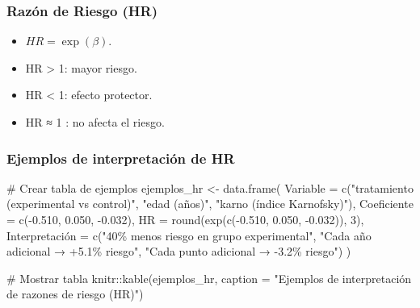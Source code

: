 \documentclass[
]{article}
\newenvironment{Shaded}{\begin{snugshade}}{\end{snugshade}}
\newcommand{\AttributeTok}[1]{\textcolor[rgb]{0.40,0.45,0.13}{#1}}
\newcommand{\CommentTok}[1]{\textcolor[rgb]{0.37,0.37,0.37}{#1}}
\newcommand{\DecValTok}[1]{\textcolor[rgb]{0.68,0.00,0.00}{#1}}
\newcommand{\FloatTok}[1]{\textcolor[rgb]{0.68,0.00,0.00}{#1}}
\newcommand{\FunctionTok}[1]{\textcolor[rgb]{0.28,0.35,0.67}{#1}}
\newcommand{\NormalTok}[1]{\textcolor[rgb]{0.00,0.23,0.31}{#1}}
\newcommand{\OtherTok}[1]{\textcolor[rgb]{0.00,0.23,0.31}{#1}}
\newcommand{\SpecialCharTok}[1]{\textcolor[rgb]{0.37,0.37,0.37}{#1}}
\newcommand{\StringTok}[1]{\textcolor[rgb]{0.13,0.47,0.30}{#1}}
\providecommand{\tightlist}{%
  \setlength{\itemsep}{0pt}\setlength{\parskip}{0pt}}\usepackage{longtable,booktabs,array}
\begin{document}
\subsubsection{Razón de Riesgo (HR)}\label{razuxf3n-de-riesgo-hr}

\begin{itemize}
\tightlist
\item
  \(HR = \exp(\beta)\).
\item
  HR \textgreater{} 1: mayor riesgo.
\item
  HR \textless{} 1: efecto protector.
\item
  HR ≈ 1 : no afecta el riesgo.
\end{itemize}

\subsubsection{Ejemplos de interpretación de
HR}\label{ejemplos-de-interpretaciuxf3n-de-hr}

\begin{Shaded}
\begin{Highlighting}[]
\CommentTok{\# Crear tabla de ejemplos}
\NormalTok{ejemplos\_hr }\OtherTok{\textless{}{-}} \FunctionTok{data.frame}\NormalTok{(}
  \AttributeTok{Variable =} \FunctionTok{c}\NormalTok{(}\StringTok{"tratamiento (experimental vs control)"}\NormalTok{,}
               \StringTok{"edad (años)"}\NormalTok{,}
               \StringTok{"karno (índice Karnofsky)"}\NormalTok{),}
  \AttributeTok{Coeficiente =} \FunctionTok{c}\NormalTok{(}\SpecialCharTok{{-}}\FloatTok{0.510}\NormalTok{, }\FloatTok{0.050}\NormalTok{, }\SpecialCharTok{{-}}\FloatTok{0.032}\NormalTok{),}
  \AttributeTok{HR =} \FunctionTok{round}\NormalTok{(}\FunctionTok{exp}\NormalTok{(}\FunctionTok{c}\NormalTok{(}\SpecialCharTok{{-}}\FloatTok{0.510}\NormalTok{, }\FloatTok{0.050}\NormalTok{, }\SpecialCharTok{{-}}\FloatTok{0.032}\NormalTok{)), }\DecValTok{3}\NormalTok{),}
\NormalTok{  Interpretación }\OtherTok{=} \FunctionTok{c}\NormalTok{(}\StringTok{"40\% menos riesgo en grupo experimental"}\NormalTok{,}
                     \StringTok{"Cada año adicional → +5.1\% riesgo"}\NormalTok{,}
                     \StringTok{"Cada punto adicional → {-}3.2\% riesgo"}\NormalTok{)}
\NormalTok{)}

\CommentTok{\# Mostrar tabla}
\NormalTok{knitr}\SpecialCharTok{::}\FunctionTok{kable}\NormalTok{(ejemplos\_hr,}
             \AttributeTok{caption =} \StringTok{"Ejemplos de interpretación de razones de riesgo (HR)"}\NormalTok{)}
\end{Highlighting}
\end{Shaded}
\end{document}
